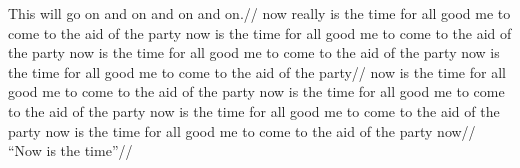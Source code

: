 



\hsize=2in
\vsize=2in
\raggedbottom

\ex[extraglskip=2ex,glbreaking=true,glhangindent=1em]
\begingl
\glpreamble This will go on and on and on and on.//
\gla
now really is the time for all good me to come to the aid of the party
now is the time for all good me to come to the aid of the party
now is the time for all good me to come to the aid of the party
now is the time for all good me to come to the aid of the party//
\glb
now is the time for all good me to come to the aid of the party
now is the time for all good me to come to the aid of the party
now is the time for all good me to come to the aid of the party
now is the time for all good me to come to the aid of the party
now//
\glft ``Now is the time''//
\endgl
\xe

\bye


